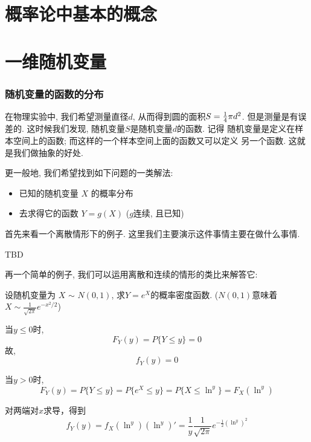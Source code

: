 
\usepackage{ctex}
\usepackage{pifont}



% 

\part{概率论中基本的概念}





\part{一维随机变量}




\section{随机变量的函数的分布}

在物理实验中, 我们希望测量直径$d$, 从而得到圆的面积$S={1\over4} \pi d^2$. 
但是测量是有误差的. 这时候我们发现, 随机变量$S$是随机变量$d$的函数. 记得
随机变量是定义在样本空间上的函数; 而这样的一个样本空间上面的函数又可以定义
另一个函数. 这就是我们做抽象的好处. 

更一般地, 我们希望找到如下问题的一类解法: 
\begin{itemize}
    \item 已知的随机变量 $X$ 的概率分布
    \item 去求得它的函数 $Y=g(X)$ ($g$连续, 且已知)
\end{itemize}

首先来看一个离散情形下的例子. 这里我们主要演示这件事情主要在做什么事情. 

TBD

再一个简单的例子, 我们可以运用离散和连续的情形的类比来解答它: 

\begin{example}
  设随机变量为 $X$ $\sim$ $N (0, 1)$, 求$Y = e^{X}$的概率密度函数. 
  ($N(0,1)$意味着$X\sim \frac1{\sqrt{2\pi}}e^{-x^2/2}$)
\end{example}
\begin{solution}
  当$y \leq 0$时,
  \[F_Y(y) = P\{Y \leq y\} = 0\]
  \quad 故,
  \[f_Y(y) = 0\]
  
  
  \quad 当$y > 0$时,
  \[F_Y(y) = P\{Y \leq y\} = P\{ e^{X} \leq y\} = P\{X \leq \ln^{y}\}= F_X(\ln^{y})\]
  
  \quad 对两端对$x$求导，得到
  \[f_Y(y) = f_X(\ln^{y})(\ln^{y})' = \frac{1}{y}\frac{1}{\sqrt{2\pi}}e^{-\frac{1}{2}(\ln^y)^2}\]

\end{solution}


